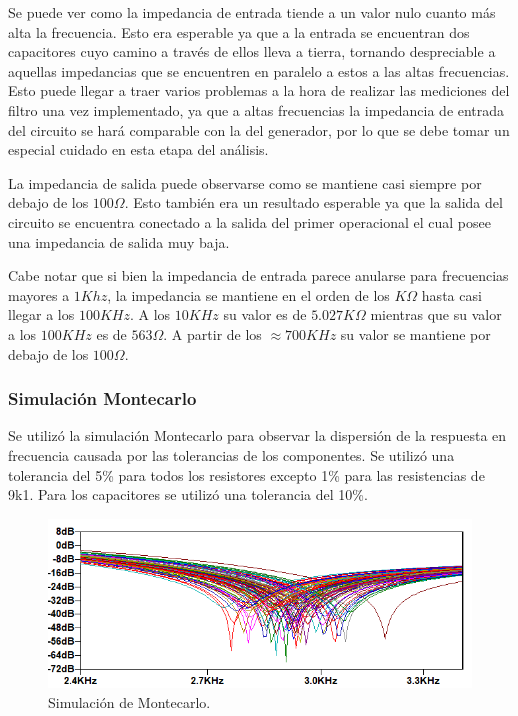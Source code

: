 Se puede ver como la impedancia de entrada tiende a un valor nulo cuanto más alta la frecuencia. Esto era esperable ya que a la entrada se encuentran dos capacitores cuyo camino a través de ellos lleva a tierra, tornando despreciable a aquellas impedancias que se encuentren en paralelo a estos a las altas frecuencias. Esto puede llegar a traer varios problemas a la hora de realizar las mediciones del filtro una vez implementado, ya que a altas frecuencias la impedancia de entrada del circuito se hará comparable con la del generador, por lo que se debe tomar un especial cuidado en esta etapa del análisis.

La impedancia de salida puede observarse como se mantiene casi siempre por debajo de los $100\Omega$. Esto también era un resultado esperable ya que la salida del circuito se encuentra conectado a la salida del primer operacional el cual posee una impedancia de salida muy baja.

Cabe notar que si bien la impedancia de entrada parece anularse para frecuencias mayores a $1Khz$, la impedancia se mantiene en el orden de los $K\Omega$ hasta casi llegar a los $100KHz$. A los $10KHz$ su valor es de $5.027K\Omega$ mientras que su valor a los $100KHz$ es de $563\Omega$. A partir de los $\approx 700KHz$ su valor se mantiene por debajo de los $100\Omega$.

\subsubsection{Simulación Montecarlo}
\label{sec:mont}
Se utilizó la simulación Montecarlo para observar la dispersión de la respuesta en frecuencia causada por las tolerancias de los componentes. Se utilizó una tolerancia del 5\% para todos los resistores excepto 1\% para las resistencias de 9k1. Para los capacitores se utilizó una tolerancia del 10\%.

\begin{figure}[H]
	\centering
	\includegraphics[width=\textwidth]{Imagenes1/Montecarlo1.PNG}
	\caption{Simulación de Montecarlo.}
	\label{fig:montecarlo}
\end{figure}

